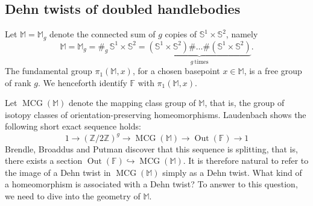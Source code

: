 \documentclass[12pt,a4paper]{amsart}
\numberwithin{equation}{section}
\DeclareMathOperator{\MCG}{MCG}
\DeclareMathOperator{\Out}{Out}
\newcommand{\FF}{\mathbb{F}}
\newcommand{\MM}{\mathbb{M}}
\newcommand{\ZZ}{\mathbb{Z}}
\theoremstyle{plain}
\theoremstyle{definition}
\theoremstyle{remark}
\begin{document}
\subsection{Dehn twists of doubled handlebodies}





Let $\MM = \MM_g$ denote the connected sum of $g$ copies of $\mathbb{S}^1 \times \mathbb{S}^2$, namely  
\[
    \MM = \MM_g = \#_g \, \mathbb{S}^1 \times \mathbb{S}^2 = \underbrace{(\mathbb{S}^1 \times \mathbb{S}^2) \# \dots \# (\mathbb{S}^1 \times \mathbb{S}^2)}_{g~\text{times}}.
\]
The fundamental group $\pi_1(\MM, x)$, for a chosen basepoint $x \in \MM$, is a free group of rank $g$. 
We henceforth identify $\FF$ with $\pi_1(\MM, x)$.

Let $\MCG(\MM)$ denote the mapping class group of $\MM$, that is, the group of isotopy classes of orientation-preserving homeomorphisms.
Laudenbach \cite{MR356056} shows the following short exact sequence holds:
\[
    1 \longrightarrow (\ZZ / 2 \ZZ)^g \longrightarrow \MCG(\MM) \longrightarrow \Out(\FF) \longrightarrow 1
\]
Brendle, Broaddus and Putman \cite{MR4557874} discover that this sequence is splitting, that is, there exists a section $\Out(\FF) \hookrightarrow \MCG(\MM)$.
It is therefore natural to refer to the image of a Dehn twist in $\MCG(\MM)$ simply as a Dehn twist.
What kind of a homeomorphism is associated with a Dehn twist?
To answer to this question, we need to dive into the geometry of $\MM$.
\end{document}
